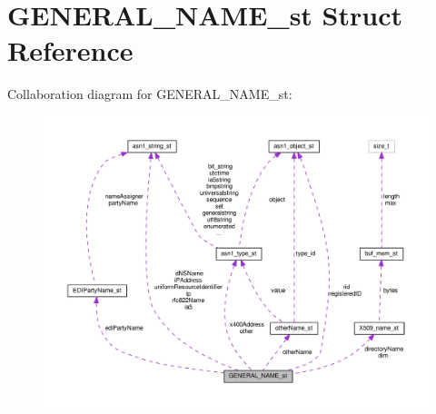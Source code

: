 \hypertarget{structGENERAL__NAME__st}{}\section{G\+E\+N\+E\+R\+A\+L\+\_\+\+N\+A\+M\+E\+\_\+st Struct Reference}
\label{structGENERAL__NAME__st}


Collaboration diagram for G\+E\+N\+E\+R\+A\+L\+\_\+\+N\+A\+M\+E\+\_\+st\+:
\nopagebreak
\begin{figure}[H]
\begin{center}
\leavevmode
\includegraphics[width=350pt]{structGENERAL__NAME__st__coll__graph}
\end{center}
\end{figure}
